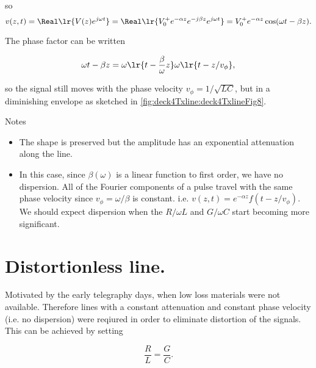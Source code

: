 so 
\begin{dmath}\label{eqn:uwaves4TransmissionLines:720}
v(z, t) 
= \Real \lr{ V(z) e^{j \omega t} }
= \Real \lr{ V_0^{+} e^{-\alpha z} e^{-j \beta z} e^{j \omega t} }
= V_0^{+} e^{-\alpha z} \cos( \omega t - \beta z ).
\end{dmath}

The phase factor can be written

\begin{dmath}\label{eqn:uwaves4TransmissionLines:740}
\omega t - \beta z 
= 
\omega \lr{ t - \frac{\beta}{\omega} z }
\omega \lr{ t - z/v_\phi },
\end{dmath}

so the signal still moves with the phase velocity \( v_\phi = 1/\sqrt{LC} \), but in a diminishing envelope as sketched in \cref{fig:deck4Txline:deck4TxlineFig8}.


Notes

\begin{itemize}
\item The shape is preserved but the amplitude has an exponential attenuation along the line.
\item In this case, since \( \beta(\omega) \) is a linear function to first order, we have no dispersion.  All of the Fourier components of a pulse travel with the same phase velocity since \( v_\phi = \omega/\beta \) is constant.  i.e.  \( v(z, t) = e^{-\alpha z} f( t - z/v_\phi ) \).  We should expect dispersion when the \( R/\omega L \) and \( G/\omega C \) start becoming more significant.
\end{itemize}

\section{Distortionless line.}

Motivated by the early telegraphy days, when low loss materials were not available.  Therefore lines with a constant attenuation and constant phase velocity (i.e. no dispersion) were reqiured in order to eliminate distortion of the signals.  This can be achieved by setting 

\begin{equation}\label{eqn:uwaves4TransmissionLines:760}
\frac{R}{L} = \frac{G}{C}.
\end{equation}

